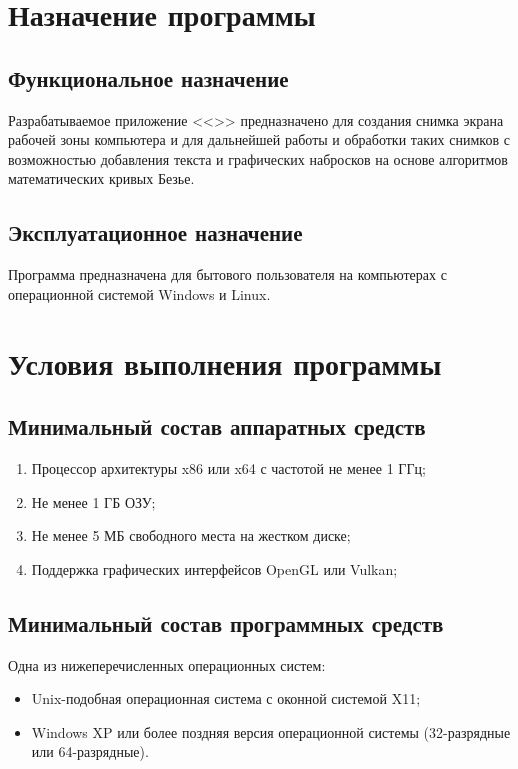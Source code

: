 \documentclass[a4paper,12pt]{article}
\begin{document}
  \CRTpreamble

  \section{Назначение программы}
  \subsection{Функциональное назначение}
  Разрабатываемое приложение <<\CRTname>> предназначено для создания снимка экрана рабочей зоны компьютера и для дальнейшей работы и обработки таких снимков с возможностью добавления текста и графических набросков на основе алгоритмов математических кривых Безье.

  \subsection{Эксплуатационное назначение}
  Программа предназначена для бытового пользователя на компьютерах с операционной системой Windows и Linux.

  \newpage
  \section{Условия выполнения программы}
  \subsection{Минимальный состав аппаратных средств}
  \begin{enumerate}
    \item Процессор архитектуры x86 или x64 с частотой не менее 1 ГГц;
    \item Не менее 1 ГБ ОЗУ;
    \item Не менее 5 МБ свободного места на жестком диске;
    \item Поддержка графических интерфейсов OpenGL или Vulkan;
  \end{enumerate}

  \subsection{Минимальный состав программных средств}
  Одна из нижеперечисленных операционных систем:
  \begin{itemize}
    \item Unix-подобная операционная система с оконной системой X11;
    \item Windows XP или более поздняя версия операционной системы (32-разрядные или 64-разрядные).
  \end{itemize}
\end{document}
